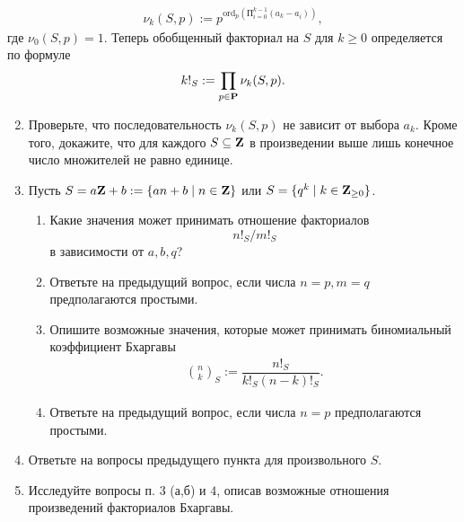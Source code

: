\begin{align*}
\nu_k(S,p) := p^{\text{ord}_p\left( \text{П}_{i = 0}^{k-1} (a_k - a_i)\right)},
\end{align*}
где $\nu_0(S,p) = 1.$ Теперь обобщенный факториал на $S$ для $k \geq 0$ определяется по формуле
\begin{align*}
k!_S := \prod_{p \in \text{\bfseries P}} \nu_k(S,p).
\end{align*}
\begin{enumerate} \setcounter{enumi}{1}
\item Проверьте, что последовательность $\nu_k(S,p)$ не зависит от выбора $a_k$. Кроме того, докажите, что для каждого $S \subseteq \text{\bfseries Z}$ в произведении выше лишь конечное число множителей не равно единице.
\item Пусть $S = a\text{\bfseries Z} + b := \{an + b \mid n \in \text{\bfseries Z}\}$ или $S = \{q^k \mid k \in \text{\bfseries Z}_{\geq 0}\}$. 
\begin{enumerate}
\item Какие значения может принимать отношение факториалов
	$$n!_S/m!_S$$
в зависимости от $a,b,q$?
\item Ответьте на предыдущий вопрос, если числа $n = p, m = q$ предполагаются простыми.
\item Опишите возможные значения, которые может принимать биномиальный коэффициент Бхаргавы
\begin{align*}
\binom{n}{k}_S := \dfrac{n!_S}{k!_S (n-k)!_S}.
\end{align*}
\item Ответьте на предыдущий вопрос, если числа $n = p$ предполагаются простыми.
\end{enumerate}

\item Ответьте на вопросы предыдущего пункта для произвольного $S.$

\item Исследуйте вопросы п. $3$ (а,б) и $4$, описав возможные отношения произведений факториалов Бхаргавы.
\end{enumerate}